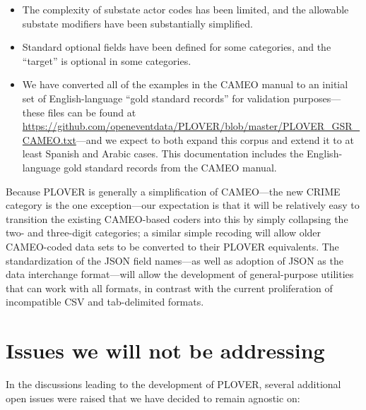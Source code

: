 \documentclass[11pt]{report}
\begin{document}
\begin{itemize}
\item The complexity of substate actor codes has been limited, and the allowable substate modifiers have been substantially simplified. 
\item Standard optional fields have been defined for some categories, and the ``target'' is optional in some categories.
\item We have converted all of the examples in the CAMEO manual to an initial set of English-language ``gold standard records'' for validation purposes---these files can be found at\\ \url{https://github.com/openeventdata/PLOVER/blob/master/PLOVER_GSR_CAMEO.txt}---and we expect to both expand this corpus and extend it to  at least Spanish and Arabic cases. This documentation includes the English-language gold standard records from the CAMEO manual.
\end{itemize}

Because PLOVER is generally a simplification of CAMEO---the new \textsf{CRIME} category is the one exception---our expectation is that it will be relatively easy to transition the existing CAMEO-based coders into this by simply collapsing the two- and three-digit categories; a similar simple recoding will allow older CAMEO-coded data sets to be converted to their PLOVER equivalents. The standardization of the JSON field names---as well as adoption of JSON as the data interchange format---will allow the development of general-purpose utilities that can work with all formats, in contrast with the current proliferation of incompatible CSV and tab-delimited formats.

\section{Issues we will not be addressing}\label{sec:nothing}

In the discussions leading to the development of PLOVER, several additional open issues were raised that we have decided to remain agnostic on:
\end{document}
